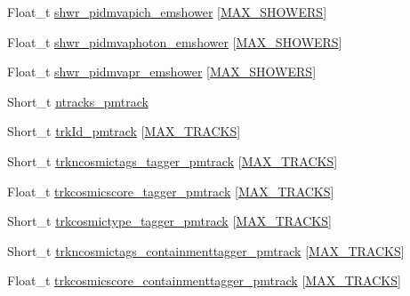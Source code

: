 \begin{DoxyCompactItemize}
Float\-\_\-t \hyperlink{classanatree_af75e1f3fdf9bde31f05fe50528f70780}{shwr\-\_\-pidmvapich\-\_\-emshower} \mbox{[}\hyperlink{anatree__core__v09410002_8h_aa8deaf72f1f7bd4b88c7d1ea07590801}{M\-A\-X\-\_\-\-S\-H\-O\-W\-E\-R\-S}\mbox{]}
\item 
Float\-\_\-t \hyperlink{classanatree_a736dd41a0716c661ec1ffe5ec1124dce}{shwr\-\_\-pidmvaphoton\-\_\-emshower} \mbox{[}\hyperlink{anatree__core__v09410002_8h_aa8deaf72f1f7bd4b88c7d1ea07590801}{M\-A\-X\-\_\-\-S\-H\-O\-W\-E\-R\-S}\mbox{]}
\item 
Float\-\_\-t \hyperlink{classanatree_a4eb600b604c899bc84335d6bced8e714}{shwr\-\_\-pidmvapr\-\_\-emshower} \mbox{[}\hyperlink{anatree__core__v09410002_8h_aa8deaf72f1f7bd4b88c7d1ea07590801}{M\-A\-X\-\_\-\-S\-H\-O\-W\-E\-R\-S}\mbox{]}
\item 
Short\-\_\-t \hyperlink{classanatree_a8cd01b78cf453dae76434d5aa9e0d2a5}{ntracks\-\_\-pmtrack}
\item 
Short\-\_\-t \hyperlink{classanatree_a5db3ef8f3ce987b9359f6f2c0be8c9b7}{trk\-Id\-\_\-pmtrack} \mbox{[}\hyperlink{anatree__core__v09410002_8h_a327fd4e796e4a0d78947524c96e4362e}{M\-A\-X\-\_\-\-T\-R\-A\-C\-K\-S}\mbox{]}
\item 
Short\-\_\-t \hyperlink{classanatree_a6e90e245b33c9df0d46d3ce8ed97a291}{trkncosmictags\-\_\-tagger\-\_\-pmtrack} \mbox{[}\hyperlink{anatree__core__v09410002_8h_a327fd4e796e4a0d78947524c96e4362e}{M\-A\-X\-\_\-\-T\-R\-A\-C\-K\-S}\mbox{]}
\item 
Float\-\_\-t \hyperlink{classanatree_a856fef9df06a4d333839520c67a554b0}{trkcosmicscore\-\_\-tagger\-\_\-pmtrack} \mbox{[}\hyperlink{anatree__core__v09410002_8h_a327fd4e796e4a0d78947524c96e4362e}{M\-A\-X\-\_\-\-T\-R\-A\-C\-K\-S}\mbox{]}
\item 
Short\-\_\-t \hyperlink{classanatree_ae01a6e74143af9a7820cdc20b2054555}{trkcosmictype\-\_\-tagger\-\_\-pmtrack} \mbox{[}\hyperlink{anatree__core__v09410002_8h_a327fd4e796e4a0d78947524c96e4362e}{M\-A\-X\-\_\-\-T\-R\-A\-C\-K\-S}\mbox{]}
\item 
Short\-\_\-t \hyperlink{classanatree_a044131062eaf456813e635cfb3612696}{trkncosmictags\-\_\-containmenttagger\-\_\-pmtrack} \mbox{[}\hyperlink{anatree__core__v09410002_8h_a327fd4e796e4a0d78947524c96e4362e}{M\-A\-X\-\_\-\-T\-R\-A\-C\-K\-S}\mbox{]}
\item 
Float\-\_\-t \hyperlink{classanatree_a9d24db71f0761252055c3dbc049aaab6}{trkcosmicscore\-\_\-containmenttagger\-\_\-pmtrack} \mbox{[}\hyperlink{anatree__core__v09410002_8h_a327fd4e796e4a0d78947524c96e4362e}{M\-A\-X\-\_\-\-T\-R\-A\-C\-K\-S}\mbox{]}

\end{DoxyCompactItemize}
